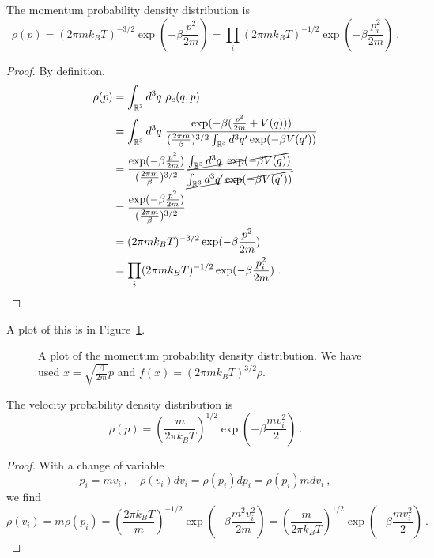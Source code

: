     The momentum probability density distribution is 
    \begin{equation*}
        \rho(p) = (2\pi m k_B T)^{-3/2} \exp(- \beta \frac{p^2}{2m}) = \prod_i (2\pi m k_B T)^{-1/2} \exp(- \beta \frac{p^2_i}{2m}) ~.
    \end{equation*}
    \begin{proof}
        By definition, 
        \begin{equation*}
        \begin{aligned}
            \rho(p) & = \int_{\mathbb R^3} d^3 q ~ \rho_c (q, p) \\ & = \int_{\mathbb R^3} d^3 q ~ \frac{\exp (- \beta ( \frac{p^2}{2m} + V(q) ))}{(\frac{2\pi m}{\beta})^{3/2} \int_{\mathbb R^3} d^3 q' \exp(- \beta V(q'))} \\ & = \frac{\exp(- \beta \frac{p^2}{2m})}{(\frac{2\pi m}{\beta})^{3/2}} \frac{\cancel{\int_{\mathbb R^3} d^3 q ~ \exp (- \beta V(q) )}}{\cancel{\int_{\mathbb R^3} d^3 q' \exp(- \beta V(q'))}} \\ & = \frac{\exp(- \beta \frac{p^2}{2m})}{(\frac{2\pi m}{\beta})^{3/2}} \\ & = (2\pi m k_B T)^{-3/2} \exp(- \beta \frac{p^2}{2m}) \\ & = \prod_i (2\pi m k_B T)^{-1/2} \exp(- \beta \frac{p^2_i}{2m}) ~.
        \end{aligned}
        \end{equation*}
    \end{proof}
    A plot of this is in Figure~\ref{max:mom}.
    \begin{figure}
        \centering
        \caption{A plot of the momentum probability density distribution. We have used $x = \sqrt{\frac{\beta}{2m}} p$ and $f(x) = (2\pi m k_B T)^{3/2} \rho$.}
        \label{max:mom}
    \end{figure}
    
    The velocity probability density distribution is
    \begin{equation*}
        \rho(p) = (\frac{m}{2\pi k_B T})^{1/2} \exp(- \beta \frac{m v^2_i}{2}) ~.
    \end{equation*}
    \begin{proof}
        With a change of variable 
        \begin{equation*}
            p_i = m v_i ~, \quad \rho(v_i) dv_i = \rho(p_i) dp_i = \rho(p_i) m dv_i ~,
        \end{equation*}
        we find
        \begin{equation*}
            \rho(v_i) = m \rho (p_i) = (\frac{2\pi k_B T}{m})^{-1/2} \exp(- \beta \frac{m^2 v^2_i}{2m}) = (\frac{m}{2\pi k_B T})^{1/2} \exp(- \beta \frac{m v^2_i}{2}) ~.
        \end{equation*}
    \end{proof}

